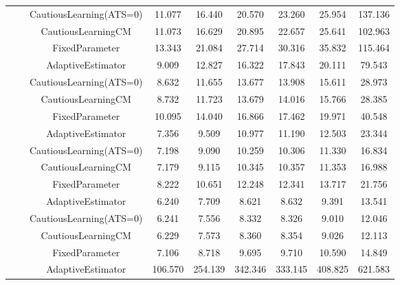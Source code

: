\begin{table}[!h]
\begin{tabular}[t]{ccccccccc}
 &  & CautiousLearning(ATS=0) & 11.077 & 16.440 & 20.570 & 23.260 & 25.954 & 137.136\\

 &  & CautiousLearningCM & 11.073 & 16.629 & 20.895 & 22.657 & 25.641 & 102.963\\

 & \multirow[t]{-4}{*}{\centering\arraybackslash 0.75} & FixedParameter & 13.343 & 21.084 & 27.714 & 30.316 & 35.832 & 115.464\\
\cmidrule{2-9}
 &  & AdaptiveEstimator & 9.009 & 12.827 & 16.322 & 17.843 & 20.111 & 79.543\\

 &  & CautiousLearning(ATS=0) & 8.632 & 11.655 & 13.677 & 13.908 & 15.611 & 28.973\\

 &  & CautiousLearningCM & 8.732 & 11.723 & 13.679 & 14.016 & 15.766 & 28.385\\

 & \multirow[t]{-4}{*}{\centering\arraybackslash 1.00} & FixedParameter & 10.095 & 14.040 & 16.866 & 17.462 & 19.971 & 40.548\\
\cmidrule{2-9}
 &  & AdaptiveEstimator & 7.356 & 9.509 & 10.977 & 11.190 & 12.503 & 23.344\\

 &  & CautiousLearning(ATS=0) & 7.198 & 9.090 & 10.259 & 10.306 & 11.330 & 16.834\\

 &  & CautiousLearningCM & 7.179 & 9.115 & 10.345 & 10.357 & 11.353 & 16.988\\

 & \multirow[t]{-4}{*}{\centering\arraybackslash 1.25} & FixedParameter & 8.222 & 10.651 & 12.248 & 12.341 & 13.717 & 21.756\\
\cmidrule{2-9}
 &  & AdaptiveEstimator & 6.240 & 7.709 & 8.621 & 8.632 & 9.391 & 13.541\\

 &  & CautiousLearning(ATS=0) & 6.241 & 7.556 & 8.332 & 8.326 & 9.010 & 12.046\\

 &  & CautiousLearningCM & 6.229 & 7.573 & 8.360 & 8.354 & 9.026 & 12.113\\

\multirow[t]{-28}{*}{\centering\arraybackslash 1} & \multirow[t]{-4}{*}{\centering\arraybackslash 1.50} & FixedParameter & 7.106 & 8.718 & 9.695 & 9.710 & 10.590 & 14.849\\
\cmidrule{1-9}
 &  & AdaptiveEstimator & 106.570 & 254.139 & 342.346 & 333.145 & 408.825 & 621.583\\


\end{tabular}
\end{table}

